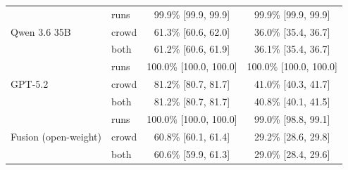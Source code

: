 \begin{table}[htbp]
{\begin{tabular}{llcc}
  \multirow{3}{*}{Qwen 3.6 35B} & runs & 99.9\% \tiny[99.9, 99.9] & 99.9\% \tiny[99.9, 99.9] \\
   & crowd & 61.3\% \tiny[60.6, 62.0] & 36.0\% \tiny[35.4, 36.7] \\
   & both & 61.2\% \tiny[60.6, 61.9] & 36.1\% \tiny[35.4, 36.7] \\
\midrule
  \multirow{3}{*}{GPT-5.2} & runs & 100.0\% \tiny[100.0, 100.0] & 100.0\% \tiny[100.0, 100.0] \\
   & crowd & 81.2\% \tiny[80.7, 81.7] & 41.0\% \tiny[40.3, 41.7] \\
   & both & 81.2\% \tiny[80.7, 81.7] & 40.8\% \tiny[40.1, 41.5] \\
\midrule
  \multirow{3}{*}{Fusion (open-weight)} & runs & 100.0\% \tiny[100.0, 100.0] & 99.0\% \tiny[98.8, 99.1] \\
   & crowd & 60.8\% \tiny[60.1, 61.4] & 29.2\% \tiny[28.6, 29.8] \\
   & both & 60.6\% \tiny[59.9, 61.3] & 29.0\% \tiny[28.4, 29.6] \\
\bottomrule
\end{tabular}%
}
\end{table}
